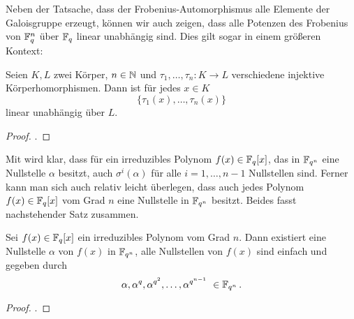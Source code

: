 Neben der Tatsache, dass der Frobenius-Automorphismus 
alle Elemente der Galoisgruppe erzeugt, können wir
auch zeigen, dass alle Potenzen des Frobenius von $\mathbb{F}_q^n$ über $\mathbb{F}_q$ linear
unabhängig sind. Dies gilt sogar in einem größeren Kontext:

\begin{satz}
  \label{satz:dedekindsches_lemma}
  Seien $K,L$ zwei Körper, $n \in \mathbb{N}$ und $\tau_1,\ldots,\tau_n: K\to L$
  verschiedene injektive Körperhomorphismen. Dann ist für jedes $x \in K$
  \[ \{\tau_1(x),\ldots,\tau_n(x) \}\]
  linear unabhängig über $L$.
\end{satz}
\begin{proof}
  \autocite[Satz 27.2]{karpfinger2010algebra}.
\end{proof}


Mit  wird klar, dass für ein
irreduzibles Polynom $f(x) \in \mathbb{F}_q[x]$, das in $\mathbb{F}_{q^n}$ eine Nullstelle 
$\alpha$ besitzt, auch $\sigma^i(\alpha)$ für alle $i=1,\ldots,n-1$
Nullstellen sind. Ferner kann man sich auch relativ leicht überlegen, dass auch
jedes Polynom $f(x) \in \mathbb{F}_q[x]$ vom Grad $n$ eine Nullstelle in 
$\mathbb{F}_{q^n}$ besitzt. Beides fasst nachstehender Satz zusammen.

\begin{satz}
  \label{satz:nst_irred_polys}
  Sei $f(x) \in \mathbb{F}_q[x]$ ein irreduzibles Polynom vom Grad $n$. Dann 
  existiert eine Nullstelle $\alpha$ von $f(x)$ in $\mathbb{F}_{q^n}$, alle 
  Nullstellen von $f(x)$ sind einfach und gegeben durch
  \[ \alpha, \alpha^q, \alpha^{q^2}, \ldots, \alpha^{q^{n-1}}\ \in \mathbb{F}_{q^n}\,.\]
\end{satz}
\begin{proof}
  \autocite[Theorem 2.14]{lidl1997finite}.
\end{proof}

